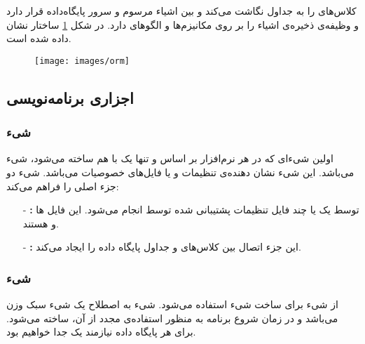 \documentclass[oneside]{report}
\begin{document}
{\normalsize {}} 
کلاس‌های 
{\normalsize {}}
را به جداول 
{\normalsize {}} 
نگاشت می‌کند و 
بین اشیاء مرسوم
{\normalsize {}} 
	و سرور پایگاه‌داده قرار دارد و وظیفه‌ی ذخیره‌ی اشیاء را بر روی مکانیزم‌ها و الگوهای  
	{\normalsize {}} 
	دارد. 
	در شکل 
	\ref{fig:orm} 
	ساختار 
		{\normalsize {}} 
	نشان داده شده است.
	
	\begin{figure}[h]
		\centering
		\texttt{[image: images/orm]}
		\caption{{\footnotesize {}} }
		\label{fig:orm}
	\end{figure}
	 
\subsection{اجزاری برنامه‌نویسی {\normalsize {}} }
	\subsubsection{شیء {\small {}} }
اولین شیءای که در هر نرم‌افزار بر اساس 
{\normalsize {}} 
و تنها یک با هم ساخته می‌شود، شیء 
{\normalsize {}} 
می‌باشد.  این شیء نشان دهنده‌ی تنظیمات و یا فایل‌های خصوصیات می‌باشد. شیء
{\normalsize {}} 
دو جزء اصلی را فراهم می‌کند:
\begin{itemize}
	\item[-]
	\textbf{{\small {}} : }
		 توسط یک یا چند فایل تنظیمات پشتیبانی شده توسط
{\normalsize {}} 
		 	انجام می‌شود.
		 	این فایل ها
		 	{\normalsize {}} 
		 	و
		 	{\normalsize {}} 
		 	هستند.
	\item[-]
		\textbf{{\small {}} : }
این جزء اتصال بین کلاس‌های 
{\normalsize {}} 
و جداول پایگاه داده را ایجاد می‌کند.
\end{itemize}
 
		\subsubsection{شیء {\small {}} }
از شیء 
{\normalsize {}} 
برای ساخت  شیء
{\normalsize {}} 
استفاده می‌شود.  شیء
{\normalsize {}} 
به اصطلاح یک شیء سبک وزن می‌باشد و در زمان شروع برنامه به منظور استفاده‌ی مجدد از آن، ساخته می‌شود. برای هر پایگاه داده نیازمند یک 
{\normalsize {}} 
جدا خواهیم بود. 
\end{document}
